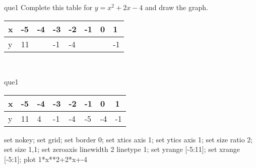 \documentclass[13.5pt, varwidth=true]{beamer}
\begin{document}
\begin{frame}[shrink=19,fragile]
	\begin{beamercolorbox}[rounded=true, left, shadow=true,wd=14.8cm]{que1}
		 Complete this table for $y = x^{2} + 2x - 4$ and draw the graph. \\[0.3cm] \renewcommand{\arraystretch}{1.2}\begin{tabular}{|C|C|C|C|C|C|C|C|} \hline x & -5 & -4 & -3 & -2 & -1 & 0 & 1 \\ \hline y & 11 &  & -1 & -4 &  &  & -1\\ \hline \end{tabular}\\[0.3cm]
	\end{beamercolorbox}
\end{frame}
\begin{frame}[shrink=19,fragile]
	\begin{beamercolorbox}[rounded=true, left, shadow=true,wd=14.8cm]{que1}
		\renewcommand{\arraystretch}{1.2}\begin{tabular}{|C|C|C|C|C|C|C|C|} \hline x & -5 & -4 & -3 & -2 & -1 & 0 & 1 \\ \hline y & 11 & 4 & -1 & -4 & -5 & -4 & -1\\ \hline \end{tabular}\begin{gnuplot}[terminal=pdf] set nokey; set grid; set border 0; set xtics axis 1; set ytics axis 1; set size ratio 2; set size 1,1; set zeroaxis linewidth 2 linetype 1; set yrange [-5:11]; set xrange [-5:1]; plot 1*x**2+2*x+-4 \end{gnuplot}
	\end{beamercolorbox}
\end{frame}
\end{document}

